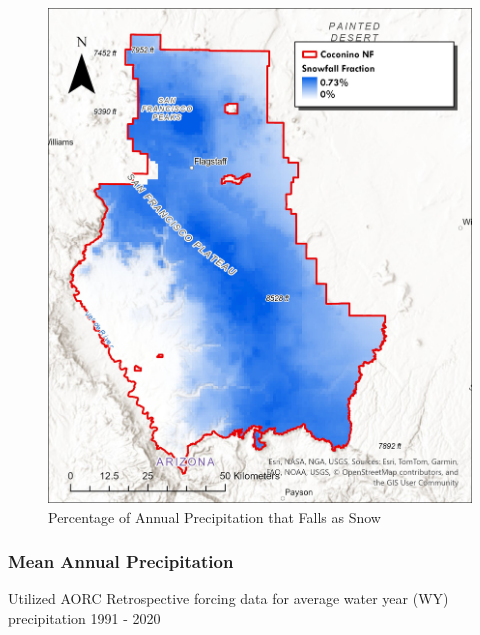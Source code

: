 \documentclass[
  number]{elsarticle}
\begin{document}
\begin{figure}[H]

{\centering \includegraphics{images/Snowfall Fraction.jpg}

}

\caption{Percentage of Annual Precipitation that Falls as Snow}

\end{figure}%

\subsubsection{Mean Annual
Precipitation}\label{mean-annual-precipitation}

Utilized AORC Retrospective forcing data for average water year (WY)
precipitation 1991 - 2020
\end{document}
